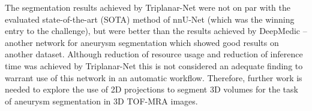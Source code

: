 The segmentation results achieved by Triplanar-Net were not on par with the evaluated state-of-the-art (SOTA) method of nnU-Net (which was the winning entry to the challenge), but were better than the results achieved by DeepMedic -- another network for aneurysm segmentation which showed good results on another dataset. Although reduction of resource usage and reduction of inference time was achieved by Triplanar-Net this is not considered an adequate finding to warrant use of this network in an automatic workflow. Therefore, further work is needed to explore the use of 2D projections to segment 3D volumes for the task of aneurysm segmentation in 3D TOF-MRA images.







